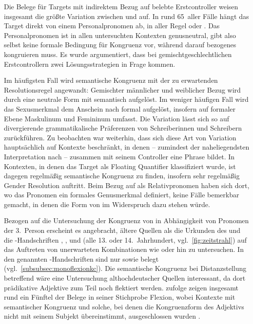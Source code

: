 Die Belege für Targets mit indirektem Bezug auf belebte Erstcontroller weisen
insgesamt die größte Variation zwischen  und  auf. In
rund 65\pct\ aller Fälle hängt das Target direkt von einem Personalpronomen ab,
in aller Regel  oder . Das Personalpronomen ist in allen
untersuchten Kontexten genusneutral, gibt also selbst keine formale Bedingung
für Kongruenz vor, während darauf bezogenes  kongruieren muss.
Es wurde argumentiert, dass bei gemischtgeschlechtlichen Erstcontrollern zwei
Lösungsstrategien in Frage kommen.

Im häufigsten Fall wird semantische Kongruenz mit der zu erwartenden
Resolutionsregel angewandt: Gemischter männlicher und weiblicher Bezug wird
durch eine neutrale Form mit \mbox{} semantisch aufgelöst. Im weniger
häufigen Fall wird das Sexusmerkmal dem Anschein nach formal aufgelöst,
insofern  auf formaler Ebene Maskulinum und Femininum umfasst. Die
Variation lässt sich so auf divergierende grammatikalische Präferenzen von
Schreiberinnen und Schreibern zurück\-führen. Zu beobachten war weiterhin, dass
sich diese Art von Variation hauptsächlich auf Kontexte beschränkt, in denen
 -- zumindest der naheliegendsten Interpretation nach --
zusammen mit seinem Controller eine Phrase bildet. In Kontexten, in denen das
Target als Floating Quantifier klassifiziert wurde, ist dagegen regelmäßig
semantische Kongruenz zu finden, insofern sehr regelmäßig Gender Resolution
auftritt. Beim Bezug auf  als Relativpronomen haben sich dort, wo
das Pronomen ein formales Genusmerkmal definiert, keine Fälle bemerkbar
gemacht, in denen die Form von  im Widerspruch dazu stehen
würde.

Bezogen auf die Untersuchung der Kongruenz von  in Abhängigkeit
von Pro\-nomen der 3.~Person erscheint es angebracht, ältere Quellen als die
Urkunden des \CAO{} und die \KC{}-Handschriften
\citet{kc:B1}, \citet{kc:C1}, \citet{kc:K} und \citet{kc:VB} (alle 13. oder
14.~Jahrhundert, vgl.~\cref{fig:zeitstrahl}) auf das Auftreten von unerwarteten
Kombinationen wie  oder  hin zu untersuchen.
In den genannten \KC{}-Handschriften sind nur 
sowie  belegt (vgl.~\cref{subsubsec:monoflexionkc}). Die
semantische Kongruenz bei Distanz\-stellung betreffend wäre eine Untersuchung
althochdeutscher Quellen interessant, da dort prädikative Adjektive zum
Teil noch flektiert werden. \citet[310--311]{fleischer2007} zufolge zeigen
insgesamt rund ein Fünftel der Belege in seiner Stichprobe Flexion, wobei
Kontexte mit semantischer Kongruenz und solche, bei denen die Kongruenzform des
Adjektivs nicht mit seinem Subjekt übereinstimmt, ausgeschlossen wurden
\autocite[304]{fleischer2007}.

